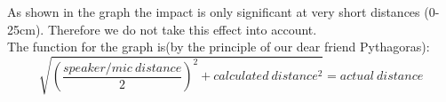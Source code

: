 As shown in the graph the impact is only significant at very short distances (0-25cm). Therefore we do not take this effect into account.\\
The function for the graph is(by the principle of our dear friend Pythagoras):\begin{equation}
\sqrt{\left(\frac{speaker/mic\ distance}{2}\right)^2+calculated\ distance^2}=actual\ distance
\end{equation}